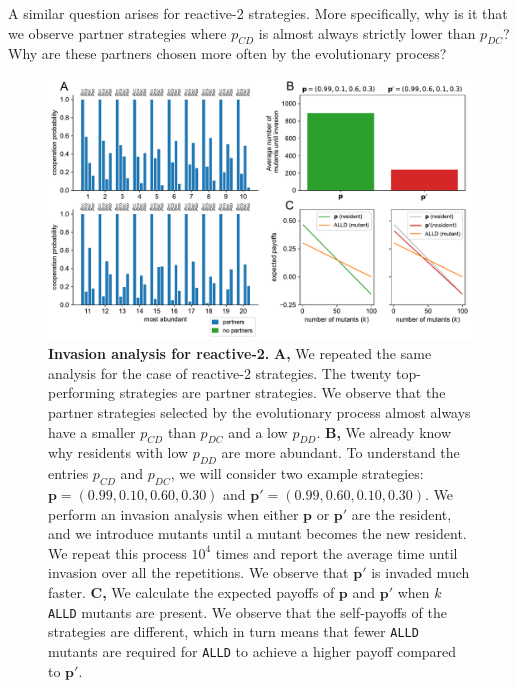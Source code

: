 \documentclass[11pt]{article}
\theoremstyle{plainCl1}
\theoremstyle{plainCl2}
\def\alld{\texttt{ALLD}}
\begin{document}
\noindent
A similar question arises for reactive-2 strategies. More specifically, why is
it that we observe partner strategies where \(p_{CD}\) is almost always strictly
lower than \(p_{DC}\)? Why are these partners chosen more often by the
evolutionary process? \\


\begin{figure}[tbhp]
  \centering
  \includegraphics[width=\textwidth]{../../figures/siFigInvasionR2.pdf}
  \caption{\textbf{Invasion analysis for reactive-2.}
  {\bf A,}  We repeated the same analysis for the case of reactive-2 strategies. The
  twenty top-performing strategies are partner strategies. We observe that
  the partner strategies selected by the evolutionary process almost always have a
  smaller \(p_{CD}\) than \(p_{DC}\) and a low \(p_{DD}\).
  {\bf B,} We already know why residents with low \(p_{DD}\) are more abundant. To
  understand the entries \(p_{CD}\) and \(p_{DC}\), we will consider two example
  strategies: \(\mathbf{p} = (0.99, 0.10, 0.60, 0.30)\) and \(\mathbf{p'} = (0.99,
  0.60, 0.10, 0.30)\). We perform an invasion analysis when either \(\mathbf{p}\)
  or \(\mathbf{p'}\) are the resident, and we introduce mutants until a mutant
  becomes the new resident. We repeat this process \(10^4\) times and report the
  average time until invasion over all the repetitions. We observe that
  \(\mathbf{p'}\) is invaded much faster.
  {\bf C,} We calculate the expected payoffs of \(\mathbf{p}\) and \(\mathbf{p'}\)
  when \(k\) \alld{} mutants are present. We observe that the self-payoffs
  of the strategies are different, which in turn means that fewer \alld{}
  mutants are required for \alld{}  to achieve a higher payoff compared to
  \(\mathbf{p'}\).
  }\label{fig:InvasionAnalysisReactive2}
\end{figure}
\end{document}
